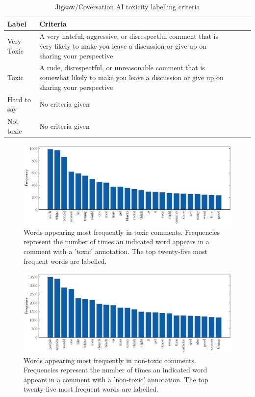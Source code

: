 \begin{table}[h]
	\caption{Jigsaw/Coversation AI toxicity labelling criteria \label{table:toxicity}}
    \centering
    \begin{tabular}{lllll}
        \toprule
        Label & Criteria \\
        \midrule
        Very Toxic & \parbox{11cm}{A very hateful, aggressive, or disrespectful comment that is very likely to make you leave a discussion or give up on sharing your perspective}\\
		\addlinespace{}
        Toxic & \parbox{10cm}{A rude, disrespectful, or unreasonable comment that is somewhat likely to make you leave a discussion or give up on sharing your perspective} & \\
		\addlinespace{}
        Hard to say & \parbox{10cm}{No criteria given} & \\
		\addlinespace{}
        Not toxic & \parbox{10cm}{No criteria given} & \\
        \bottomrule
    \end{tabular}
\end{table}

\begin{figure}
	\includegraphics[width=1.0\textwidth]{graphics/toxic_word_freq.pdf}
    \caption{Words appearing most frequently in toxic comments.  Frequencies represent the number of times an indicated word appears in a comment with a 'toxic' annotation. The top twenty-five most frequent words are labelled.}
	\label{fig:toxic-word-frequency}
\end{figure}


\begin{figure}
	\includegraphics[width=1.0\textwidth]{graphics/nontoxic_word_freq.pdf}
    \caption{Words appearing most frequently in non-toxic comments. Frequencies represent the number of times an indicated word appears in a comment with a 'non-toxic' annotation. The top twenty-five most frequent words are labelled.}
	\label{fig:non-toxic-word-frequency}
\end{figure}